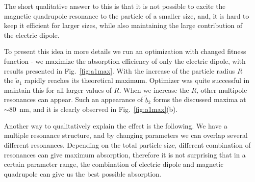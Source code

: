 \documentclass[a4paper]{article}
\begin{document}
The short qualitative answer to this is that it is not possible to
excite the magnetic quadrupole resonance to the particle of a smaller
size, and, it is hard to keep it efficient for larger sizes, while
also maintaining the large contribution of the electric dipole.

To present this idea in more details we run an optimization with
changed fitness function - we maximize the absorption efficiency of
only the electric dipole, with results presented in
Fig.~\ref{fig:a1max}. With the increase of the particle radius $R$ the
$\tilde{a}_1$ rapidly reaches its theoretical maximum. Optimizer was
quite successful in maintain this for all larger values of $R$. When
we increase the $R$, other multipole resonances can appear. Such an
appearance of $\tilde{b}_2$ forms the discussed maxima at $\sim
80$~nm, and it is clearly observed in Fig.~\ref{fig:a1max}(b).

Another way to qualitatively explain the effect is the following. We
have a multiple resonance structure, and by changing parameters we can
overlap several different resonances. Depending on the total particle
size, different combination of resonances can give maximum absorption,
therefore it is not surprising that in a certain parameter range, the
combination of electric dipole and magnetic quadrupole can give us the
best possible absorption.
\end{document}
